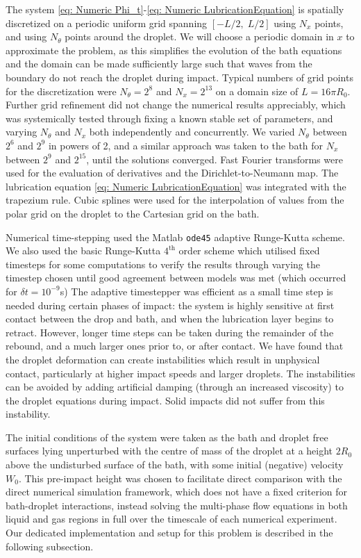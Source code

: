 The system \eqref{eq: Numeric Phi_t}-\eqref{eq: Numeric LubricationEquation} is  spatially discretized on a periodic uniform grid spanning $[-L/2,\; L/2]$ using $N_x$ points, and using $N_\theta$ points around the droplet. We will choose a periodic domain in $x$ to approximate the problem, as this simplifies the evolution of the bath equations and the domain can be made sufficiently large such that waves from the boundary do not reach the droplet during impact. Typical numbers of grid points for the discretization were $N_\theta=2^8$ and $N_x = 2^{13}$ on a domain size of $L = 16 \pi R_0$. Further grid refinement did not change the numerical results appreciably, which was systemically tested through fixing a known stable set of parameters, and varying $N_\theta$ and $N_x$ both independently and concurrently. We varied $N_\theta$ between $2^6$ and $2^9$ in powers of 2, and a similar approach was taken to the bath for $N_x$ between $2^9$ and $2^{15}$, until the solutions converged.
Fast Fourier transforms were used for the evaluation of derivatives and the Dirichlet-to-Neumann map. The lubrication equation \eqref{eq: Numeric LubricationEquation} was integrated with the trapezium rule. Cubic splines were used for the interpolation of values from the polar grid on the droplet to the Cartesian grid on the bath.

Numerical time-stepping used the Matlab \texttt{ode45} adaptive Runge-Kutta scheme. We also used the basic Runge-Kutta $4^{\textrm{th}}$ order scheme which utilised fixed timesteps for some computations to verify the results through varying the timestep chosen until good agreement between models was met (which occurred for $\delta t = 10^{-9}$s) 
The adaptive timestepper was efficient as a small time step is needed during certain phases of impact: the system is highly sensitive at first contact between the drop and bath, and when the lubrication layer begins to retract. However, longer time steps can be taken during the remainder of the rebound, and a much larger ones prior to, or after contact. We have found that the droplet deformation can create instabilities which result in unphysical contact, particularly at higher impact speeds and larger droplets. The instabilities can be avoided by adding artificial damping (through an increased viscosity) to the droplet equations during impact. Solid impacts did not suffer from this instability. 

The initial conditions of the system were taken as the bath and droplet free surfaces lying unperturbed with the centre of mass of the droplet at a height $2R_0$ above the undisturbed surface of the bath, with some initial (negative) velocity $W_0$. This pre-impact height was chosen to facilitate direct comparison with the direct numerical simulation framework, which does not have a fixed criterion for bath-droplet interactions, instead solving the multi-phase flow equations in both liquid and gas regions in full over the timescale of each numerical experiment. Our dedicated implementation and setup for this problem is described in the following subsection. 

